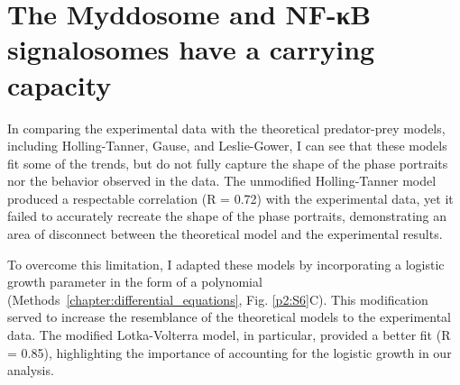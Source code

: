 \section{The Myddosome and NF-κB signalosomes have a carrying capacity}
In comparing the experimental data with the theoretical predator-prey models, including Holling-Tanner, Gause, and Leslie-Gower, I can see that these models fit some of the trends, but do not fully capture the shape of the phase portraits nor the behavior observed in the data. The unmodified Holling-Tanner model produced a respectable correlation (R = 0.72) with the experimental data, yet it failed to accurately recreate the shape of the phase portraits, demonstrating an area of disconnect between the theoretical model and the experimental results.

To overcome this limitation, I adapted these models by incorporating a logistic growth parameter in the form of a polynomial (Methods~\ref{chapter:differential_equations}, Fig. \ref{p2:S6}C). This modification served to increase the resemblance of the theoretical models to the experimental data. The modified Lotka-Volterra model, in particular, provided a better fit (R = 0.85), highlighting the importance of accounting for the logistic growth in our analysis.




